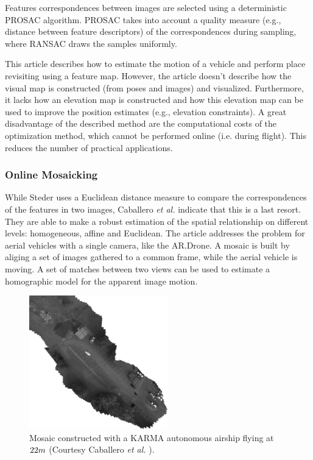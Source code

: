 Features correspondences between images are selected using a deterministic PROSAC \cite{chum2005matching} algorithm.
PROSAC takes into account a quality measure (e.g., distance between feature descriptors) of the correspondences during sampling, where RANSAC draws the samples uniformly.

This article describes how to estimate the motion of a vehicle and perform place revisiting using a feature map.
However, the article doesn't describe how the visual map is constructed (from poses and images) and visualized.
Furthermore, it lacks how an elevation map is constructed and how this elevation map can be used to improve the position estimates (e.g., elevation constraints).
A great disadvantage of the described method are the computational costs of the optimization method, which cannot be performed online (i.e. during flight). This reduces the number of practical applications.


\subsubsection{Online Mosaicking}
While Steder uses a Euclidean distance measure to compare the correspondences of the features in two images, Caballero \textit{et al.} \cite{caballero2009unmanned} indicate that this is a last resort.
They are able to make a robust estimation of the spatial relationship on different levels: homogeneous, affine and Euclidean.
The article addresses the problem for aerial vehicles with a single camera, like the AR.Drone.
A mosaic is built by aliging a set of images gathered to a common frame, while the aerial vehicle is moving.
A set of matches between two views can be used to estimate a homographic model for the apparent image motion.

\begin{figure}[htb]
\centering
\includegraphics[width=6cm]{images/Caballero_map.png}
\caption{Mosaic constructed with a KARMA autonomous airship flying at $22\small{m}$ (Courtesy Caballero \textit{et al.} \cite{caballero}).}
\label{fig:Caballero_map}
\end{figure}


